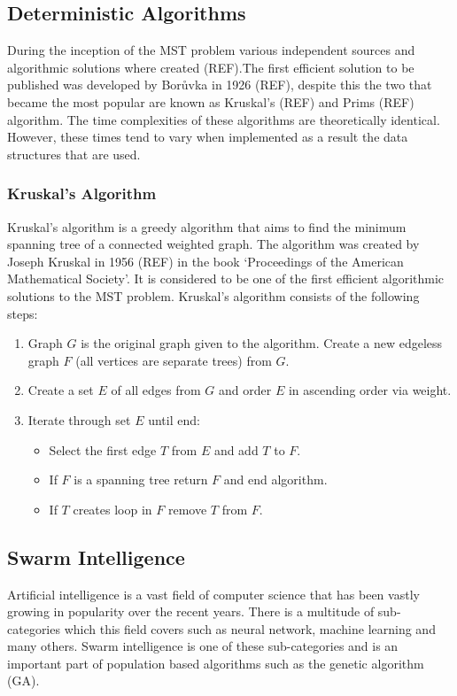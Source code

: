 \documentclass{AISB2008}
\begin{document}
\subsection{Deterministic Algorithms}
During the inception of the MST problem various independent sources and algorithmic solutions where created (REF).The first efficient solution to be published was developed by Borůvka in 1926 (REF), despite this the two that became the most popular are known as Kruskal’s (REF) and Prims (REF) algorithm. The time complexities of these algorithms are theoretically identical. However, these times tend to vary when implemented as a result the data structures that are used.


\subsubsection{Kruskal's Algorithm}
Kruskal’s algorithm is a greedy algorithm that aims to find the minimum spanning tree of a connected weighted graph. The algorithm was created by Joseph Kruskal in 1956 (REF) in the book ‘Proceedings of the American Mathematical Society’. It is considered to be one of the first efficient algorithmic solutions to the MST problem.
Kruskal’s algorithm consists of the following steps:

\begin{enumerate}
\item Graph {$G$} is the original graph given to the algorithm. Create a new edgeless graph {$F$} (all vertices are separate trees) from {$G$}.
\item Create a set {$E$} of all edges from {$G$} and order {$E$} in ascending order via weight.
\item Iterate through set {$E$} until end:
\begin{itemize}
\item Select the first edge {$T$} from {$E$} and add {$T$} to {$F$}.
\item If {$F$} is a spanning tree return {$F$} and end algorithm.
\item If {$T$} creates loop in {$F$} remove {$T$} from {$F$}.
\end{itemize}
\end{enumerate}

\subsection{Swarm Intelligence}
Artificial intelligence is a vast field of computer science that has been vastly growing in popularity over the recent years. There is a multitude of sub-categories which this field covers such as neural network, machine learning and many others. Swarm intelligence is one of these sub-categories and is an important part of population based algorithms such as the genetic algorithm (GA).
\end{document}
